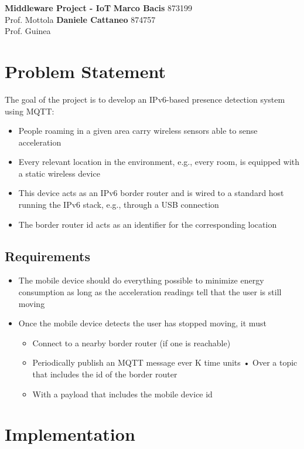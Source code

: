 \documentclass[a4paper, 11pt]{article}
\begin{document}
\noindent
\large\textbf{Middleware Project - IoT} \hfill \textbf{Marco Bacis} 873199 \\
Prof. Mottola \hfill \textbf{Daniele Cattaneo} 874757 \\
Prof. Guinea
\section*{Problem Statement}

The goal of the project is to develop an IPv6-based presence detection system using MQTT:
\begin{itemize}
\item People roaming in a given area carry wireless sensors able to sense acceleration
\item Every relevant location in the environment, e.g., every room, is equipped with a static wireless device
\item This device acts as an IPv6 border router and is wired to a standard host running the IPv6 stack, e.g., through a USB connection
\item The border router id acts as an identifier for the corresponding location
\end{itemize}

\subsection*{Requirements}

\begin{itemize}
\item The mobile device should do everything possible to minimize energy consumption as long as the acceleration readings tell that the user is still moving
\item Once the mobile device detects the user has stopped moving, it must
\begin{itemize}
    \item Connect to a nearby border router (if one is reachable)
    \item Periodically publish an MQTT message ever K time units • Over a topic that includes the id of the border router
    \item With a payload that includes the mobile device id
\end{itemize}

\end{itemize}

\section*{Implementation}
\end{document}
